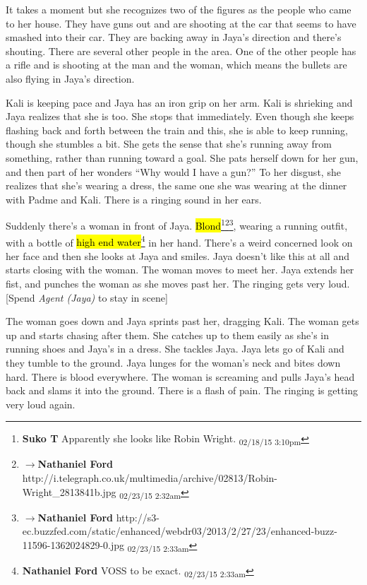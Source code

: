 It takes a moment but she recognizes two of the figures as the people who came to her house.  They have guns out and are shooting at the car that seems to have smashed into their car.  They are backing away in Jaya's direction and there's shouting.  There are several other people in the area.  One of the other people has a rifle and is shooting at the man and the woman, which means the bullets are also flying in Jaya's direction.



Kali is keeping pace and Jaya has an iron grip on her arm.  Kali is shrieking and Jaya realizes that she is too.  She stops that immediately.  Even though she keeps flashing back and forth between the train and this, she is able to keep running, though she stumbles a bit.  She gets the sense that she's running away from something, rather than running toward a goal.  She pats herself down for her gun, and then part of her wonders ``Why would I have a gun?''  To her disgust, she realizes that she's wearing a dress, the same one she was wearing at the dinner with Padme and Kali.  There is a ringing sound in her ears.



Suddenly there's a woman in front of Jaya.  \hl{Blond}\footnote{\textbf{Suko T }Apparently she looks like Robin Wright. \textsubscript{02/18/15 3:10pm}}\footnote{$\rightarrow$\textbf{Nathaniel Ford }http://i.telegraph.co.uk/multimedia/archive/02813/Robin-Wright\_2813841b.jpg \textsubscript{02/23/15 2:32am}}\footnote{$\rightarrow$\textbf{Nathaniel Ford }http://s3-ec.buzzfed.com/static/enhanced/webdr03/2013/2/27/23/enhanced-buzz-11596-1362024829-0.jpg \textsubscript{02/23/15 2:33am}}, wearing a running outfit, with a bottle of \hl{high end water}\footnote{\textbf{Nathaniel Ford }VOSS to be exact. \textsubscript{02/23/15 2:33am}} in her hand.  There's a weird concerned look on her face and then she looks at Jaya and smiles.  Jaya doesn't like this at all and starts closing with the woman. The woman moves to meet her. Jaya extends her fist, and punches the woman as she moves past her.  The ringing gets very loud.  {[}Spend \textit{Agent (Jaya)} to stay in scene{]}



The woman goes down and Jaya sprints past her, dragging Kali.  The woman gets up and starts chasing after them.  She catches up to them easily as she's in running shoes and Jaya's in a dress.  She tackles Jaya.  Jaya lets go of Kali and they tumble to the ground.  Jaya lunges for the woman's neck and bites down hard.  There is blood everywhere.  The woman is screaming and pulls Jaya's head back and slams it into the ground. There is a flash of pain. The ringing is getting very loud again.



